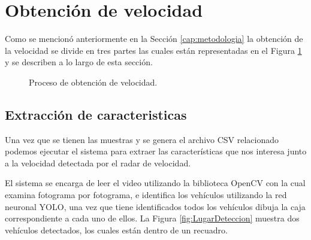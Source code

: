 \section{Obtención de velocidad}

Como se mencionó anteriormente en la Sección \ref{cap:metodologia} la obtención de la velocidad se divide en tres partes las cuales están representadas en el Figura \ref{fig:DFObtencionDeVelocidad} y se describen a lo largo de esta sección.

\begin{figure}[H]
    \centering

    \caption{Proceso de obtención de velocidad.}
    \label{fig:DFObtencionDeVelocidad}
\end{figure}

\subsection{Extracción de caracteristicas }

Una vez que se tienen las muestras y se genera el archivo CSV relacionado podemos ejecutar el sistema para extraer las características que nos interesa junto a la velocidad detectada por el radar de velocidad.

El sistema se encarga de leer el video utilizando la biblioteca OpenCV con la cual examina fotograma por fotograma, e identifica los vehículos utilizando la red neuronal YOLO, una vez que tiene identificados todos los vehículos dibuja la caja correspondiente a cada uno de ellos. La Figura \ref{fig:LugarDeteccion} muestra dos vehículos detectados, los cuales están dentro de un recuadro.

